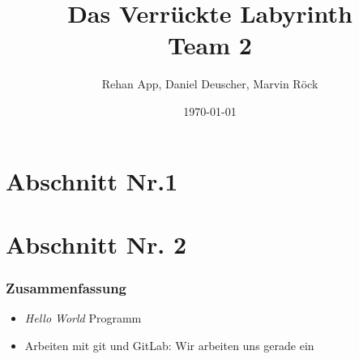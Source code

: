 \documentclass[hyperref={pdfpagelabels=false}]{beamer}
\title{Das Verrückte Labyrinth\\Team 2}
\author{Rehan App, Daniel Deuscher, Marvin Röck}
\date{\today}
\begin{document}
\begin{frame}
\titlepage
\end{frame} 

\section{Abschnitt Nr.1} 
\begin{frame}
\end{frame}

\section{Abschnitt Nr. 2}
\begin{frame}
\end{frame}

\begin{frame}
\frametitle{Zusammenfassung}
\begin{itemize}
	\item \textit{Hello World} Programm \checkmark
	\item Arbeiten mit git und GitLab: Wir arbeiten uns gerade ein
\end{itemize} 
\end{frame}
\end{document}
